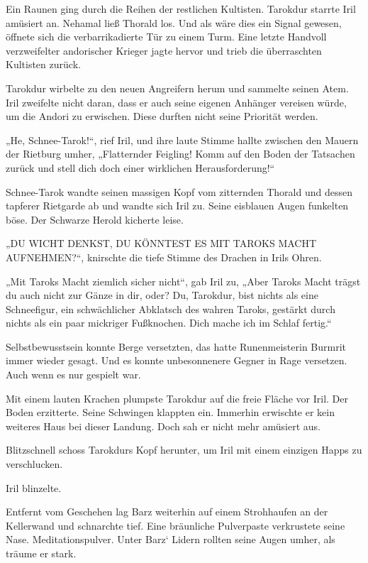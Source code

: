 Ein Raunen ging durch die Reihen der restlichen Kultisten. Tarokdur starrte Iril amüsiert an. Nehamal ließ Thorald los. Und als wäre dies ein Signal gewesen, öffnete sich die verbarrikadierte Tür zu einem Turm. Eine letzte Handvoll verzweifelter andorischer Krieger jagte hervor und trieb die überraschten Kultisten zurück.

Tarokdur wirbelte zu den neuen Angreifern herum und sammelte seinen Atem. Iril zweifelte nicht daran, dass er auch seine eigenen Anhänger vereisen würde, um die Andori zu erwischen. Diese durften nicht seine Priorität werden.

„He, Schnee-Tarok!“, rief Iril, und ihre laute Stimme hallte zwischen den Mauern der Rietburg umher, „Flatternder Feigling! Komm auf den Boden der Tatsachen zurück und stell dich doch einer wirklichen Herausforderung!“

Schnee-Tarok wandte seinen massigen Kopf vom zitternden Thorald und dessen tapferer Rietgarde ab und wandte sich Iril zu. Seine eisblauen Augen funkelten böse. Der Schwarze Herold kicherte leise.

„DU WICHT DENKST, DU KÖNNTEST ES MIT TAROKS MACHT AUFNEHMEN?“, knirschte die tiefe Stimme des Drachen in Irils Ohren.

„Mit Taroks Macht ziemlich sicher nicht“, gab Iril zu, „Aber Taroks Macht trägst du auch nicht zur Gänze in dir, oder? Du, Tarokdur, bist nichts als eine Schneefigur, ein schwächlicher Abklatsch des wahren Taroks, gestärkt durch nichts als ein paar mickriger Fußknochen. Dich mache ich im Schlaf fertig.“

Selbstbewusstsein konnte Berge versetzten, das hatte Runenmeisterin Burmrit immer wieder gesagt. Und es konnte unbesonnenere Gegner in Rage versetzen. Auch wenn es nur gespielt war.

Mit einem lauten Krachen plumpste Tarokdur auf die freie Fläche vor Iril. Der Boden erzitterte. Seine Schwingen klappten ein. Immerhin erwischte er kein weiteres Haus bei dieser Landung. Doch sah er nicht mehr amüsiert aus.

Blitzschnell schoss Tarokdurs Kopf herunter, um Iril mit einem einzigen Happs zu verschlucken.

Iril blinzelte.\bigskip







Entfernt vom Geschehen lag Barz weiterhin auf einem Strohhaufen an der Kellerwand und schnarchte tief. Eine bräunliche Pulverpaste verkrustete seine Nase. Meditationspulver. Unter Barz‘ Lidern rollten seine Augen umher, als träume er stark.

